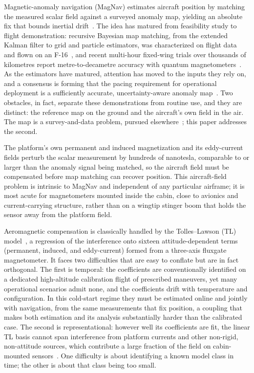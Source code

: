 \documentclass{IEEEtaes}
\begin{document}
Magnetic-anomaly navigation (MagNav) estimates aircraft position by matching the
measured scalar field against a surveyed anomaly map, yielding an absolute fix that
bounds inertial drift~\cite{canciani2017}. The idea has matured from feasibility
study to flight demonstration: recursive Bayesian map matching, from the extended
Kalman filter to grid and particle estimators, was characterized on flight
data~\cite{canciani2016,canciani2017} and flown on an F-16~\cite{canciani2020}, and
recent multi-hour fixed-wing trials over thousands of kilometres report
metre-to-decametre accuracy with quantum magnetometers~\cite{qctrl2025}. As the
estimators have matured, attention has moved to the inputs they rely on, and a
consensus is forming that the pacing requirement for operational deployment is a
sufficiently accurate, uncertainty-aware anomaly map~\cite{angappan2026}. Two
obstacles, in fact, separate these demonstrations from routine use, and they are
distinct: the reference map on the ground and the aircraft's own field in the air.
The map is a survey-and-data problem, pursued elsewhere~\cite{angappan2026}; this
paper addresses the second.

The platform's own permanent and induced magnetization and its eddy-current fields
perturb the scalar measurement by hundreds of nanotesla, comparable to or larger
than the anomaly signal being matched, so the aircraft field must be compensated
before map matching can recover position. This aircraft-field problem is intrinsic
to MagNav and independent of any particular airframe; it is most acute for
magnetometers mounted inside the cabin, close to avionics and current-carrying
structure, rather than on a wingtip stinger boom that holds the sensor away from the
platform field.

Aeromagnetic compensation is classically handled by the Tolles--Lawson (TL)
model~\cite{tolles1950,leliak1961,bickel1979}, a regression of the interference onto
sixteen attitude-dependent terms (permanent, induced, and eddy-current) formed from a
three-axis fluxgate magnetometer. It faces two difficulties that are easy to conflate
but are in fact orthogonal. The first is temporal: the coefficients are
conventionally identified on a dedicated high-altitude calibration flight of
prescribed maneuvers, yet many operational scenarios admit none, and the coefficients
drift with temperature and configuration. In this cold-start regime they must be
estimated online and jointly with navigation, from the same measurements that fix
position, a coupling that makes both estimation and its analysis substantially harder
than the calibrated case. The second is representational: however well its
coefficients are fit, the linear TL basis cannot span interference from platform
currents and other non-rigid, non-attitude sources, which contribute a large fraction
of the field on cabin-mounted sensors~\cite{gnadt2020,gnadt2022}. One difficulty is
about identifying a known model class in time; the other is about that class being
too small.
\end{document}
